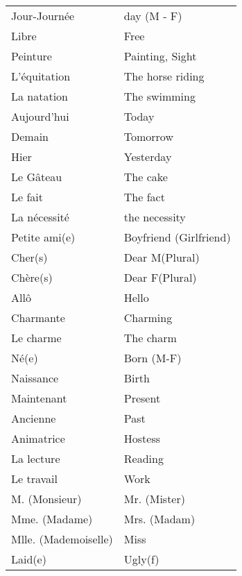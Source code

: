 \begin{longtable}{l  l}
Jour-Journ\'ee & day (M - F) \\
Libre & Free \\
Peinture & Painting, Sight \\
L'\'equitation & The horse riding \\
La natation & The swimming \\
Aujourd'hui & Today \\
Demain & Tomorrow \\
Hier & Yesterday \\
Le G\^ateau & The cake \\
Le fait & The fact \\
La n\'ecessit\'e & the necessity \\
Petite ami(e) & Boyfriend (Girlfriend) \\
Cher(s) & Dear M(Plural) \\
Ch\`ere(s) & Dear F(Plural) \\
All\^o & Hello \\
Charmante & Charming \\
Le charme & The charm \\
N\'e(e) & Born (M-F) \\
Naissance & Birth \\
Maintenant & Present \\
Ancienne & Past \\
Animatrice & Hostess \\
La lecture & Reading \\
Le travail & Work \\
M. (Monsieur) & Mr. (Mister) \\
Mme. (Madame) & Mrs. (Madam) \\
Mlle. (Mademoiselle) & Miss \\
Laid(e) & Ugly(f) \\
\end{longtable}

